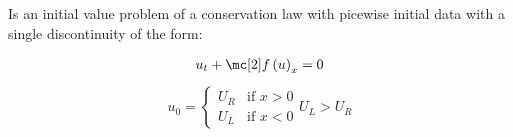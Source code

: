 \begin{defnbox}\nospacing
    \begin{defn}\label{defn:riemann_problem}
        Is an initial value problem of a conservation law with
        picewise initial data with a single discontinuity of the form:\\
        \begin{minipage}{0.4\textwidth}
            \begin{align}
            u_{t}+\flux \left(u\right)_{x}=0
            \end{align}
            \begin{align}
            u_{0}=\begin{cases}
                    U_{R}&\text{if }x>0\\
                    U_{L}&\text{if }x<0
                    \end{cases}
            \label{eq:riemann_problem}
                    U_{L}>U_{R}
            \end{align}
        \end{minipage}\hfil
        \begin{minipage}[c]{0.4\textwidth}
            \begin{figure}[H]
                \centering{
                  \def\svgwidth{100pt}
                  \resizebox{\linewidth}{!}{}
                }
            \end{figure}
        \end{minipage}
    \end{defn}
\end{defnbox}
